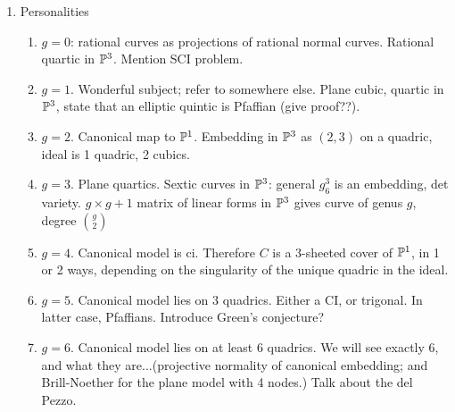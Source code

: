 \documentclass[12pt, leqno]{article}
\begin{document}
\begin{enumerate}
\item Personalities
\begin{enumerate}
\item $g=0$: rational curves as projections of rational normal curves. Rational quartic in ${\mathbb P}^3$. Mention SCI problem.
\item $g=1$. Wonderful subject; refer to somewhere else. Plane cubic, quartic in ${\mathbb P}^3$, state that an elliptic quintic is Pfaffian (give proof??).
\item $g=2$. Canonical map to ${\mathbb P}^1$. Embedding in ${\mathbb P}^3$ as $(2,3)$ on a quadric, ideal is 1 quadric, 2 cubics.
\item $g=3$. Plane quartics. Sextic curves in ${\mathbb P}^3$: general $g^3_6$ is an embedding, det variety.  $g\times g+1$ matrix of linear forms in ${\mathbb P}^3$ gives curve of genus $g$, degree ${g\choose 2}$
\item $g=4$. Canonical model is ci. Therefore $C$ is a 3-sheeted cover of ${\mathbb P}^1$, in 1 or 2 ways, depending on the singularity of the unique quadric in the ideal.
\item $g=5$. Canonical model lies on 3 quadrics. Either a CI, or trigonal. In latter case, Pfaffians. Introduce Green's conjecture?
\item $g=6$. Canonical model lies on at least 6 quadrics. We will see exactly 6, and what they are...(projective normality of canonical embedding; and Brill-Noether for the plane model with 4 nodes.) Talk about the del Pezzo.
\end{enumerate}


\end{enumerate}
\end{document}
